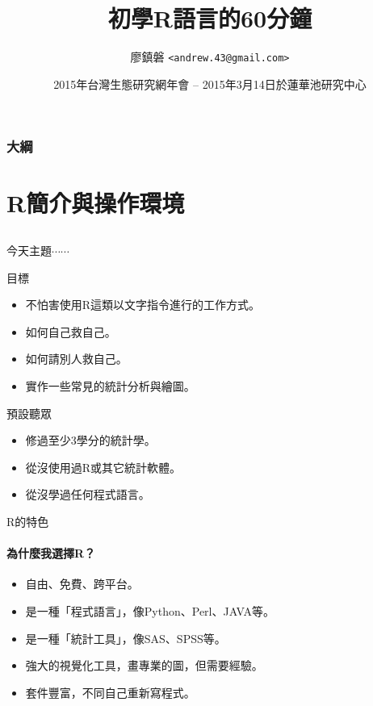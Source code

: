 \documentclass[14pt, aspectratio=43]{beamer}
\title{初學R語言的60分鐘}
\author{廖鎮磐 \texttt{<andrew.43@gmail.com>}}
\institute{東海大學生命科學系}
\date{2015年台灣生態研究網年會 -- 2015年3月14日於蓮華池研究中心}
\begin{document}
\xeCJKOffVerbAddon


\begin{frame}
\titlepage
\end{frame}

\begin{frame}
\frametitle{大綱}
\tableofcontents
\end{frame}

\section{R簡介與操作環境}\subsection{}

\begin{frame}{今天主題$\cdots\cdots$}

\begin{block}{目標}
\begin{itemize}
\item 不怕害使用R這類以文字指令進行的工作方式。
\item 如何自己救自己。
\item 如何請別人救自己。
\item 實作一些常見的統計分析與繪圖。
\end{itemize}
\end{block}

\begin{block}{預設聽眾}
\begin{itemize}
\item 修過至少3學分的統計學。
\item 從沒使用過R或其它統計軟體。
\item 從沒學過任何程式語言。
\end{itemize}
\end{block}

\end{frame}




\begin{frame}{R的特色}
\framesubtitle{為什麼我選擇R？}
\begin{itemize}
\item 自由、免費、跨平台。
\item 是一種「程式語言」，像Python、Perl、JAVA等。
\item 是一種「統計工具」，像SAS、SPSS等。
\item 強大的視覺化工具，畫專業的圖，但需要經驗。
\item 套件豐富，不同自己重新寫程式。
\end{itemize}
\end{frame}
\end{document}
